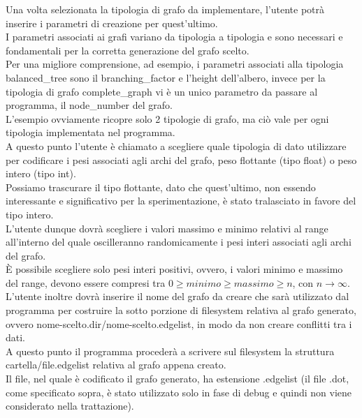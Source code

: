 Una volta selezionata la tipologia di grafo da implementare, l'utente potrà inserire i parametri di creazione per quest'ultimo.\\
I parametri associati ai grafi variano da tipologia a tipologia e sono necessari e fondamentali per la corretta generazione del grafo scelto.\\

Per una migliore comprensione, ad esempio, i parametri associati alla tipologia balanced\_tree sono il branching\_factor e l'height dell'albero, invece per la tipologia di grafo complete\_graph vi è un unico parametro da passare al programma, il node\_number del grafo.\\
L'esempio ovviamente ricopre solo 2 tipologie di grafo, ma ciò vale per ogni tipologia implementata nel programma.\\

A questo punto l'utente è chiamato a scegliere quale tipologia di dato utilizzare per codificare i pesi associati agli archi del grafo, peso flottante (tipo float) o peso intero (tipo int).\\
Possiamo trascurare il tipo flottante, dato che quest'ultimo, non essendo interessante e significativo per la sperimentazione, è stato tralasciato in favore del tipo intero.\\

L'utente dunque dovrà scegliere i valori massimo e minimo relativi al range all'interno del quale oscilleranno randomicamente i pesi interi associati agli archi del grafo.\\
È possibile scegliere solo pesi interi positivi, ovvero, i valori minimo e massimo del range, devono essere compresi tra \(0 \geq minimo \geq massimo \geq n\), con \(n\to\infty\).\\

L'utente inoltre dovrà inserire il nome del grafo da creare che sarà utilizzato dal programma per costruire la sotto porzione di filesystem relativa al grafo generato, ovvero nome-scelto.dir/nome-scelto.edgelist, in modo da non creare conflitti tra i dati.\\

A questo punto il programma procederà a scrivere sul filesystem la struttura cartella/file.edgelist relativa al grafo appena creato.\\

Il file, nel quale è codificato il grafo generato, ha estensione .edgelist (il file .dot, come specificato sopra, è stato utilizzato solo in fase di debug e quindi non viene considerato nella trattazione).\\

